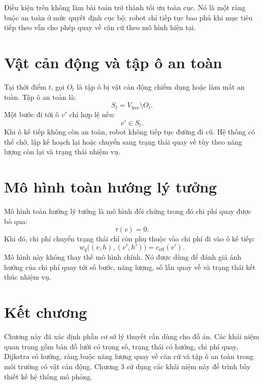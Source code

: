 \documentclass[../DoAn.tex]{subfiles}
\begin{document}
Điều kiện trên không làm bài toán trở thành tối ưu toàn cục. Nó là một ràng buộc an toàn ở mức quyết định cục bộ: robot chỉ tiếp tục bao phủ khi mục tiêu tiếp theo vẫn cho phép quay về căn cứ theo mô hình hiện tại.

\section{Vật cản động và tập ô an toàn}

Tại thời điểm $t$, gọi $O_t$ là tập ô bị vật cản động chiếm dụng hoặc làm mất an toàn. Tập ô an toàn là:
\begin{equation}
S_t=V_{\text{free}}\setminus O_t.
\end{equation}
Một bước đi tới ô $v'$ chỉ hợp lệ nếu:
\begin{equation}
v'\in S_t.
\end{equation}
Khi ô kế tiếp không còn an toàn, robot không tiếp tục đường đi cũ. Hệ thống có thể chờ, lập kế hoạch lại hoặc chuyển sang trạng thái quay về tùy theo năng lượng còn lại và trạng thái nhiệm vụ.

\section{Mô hình toàn hướng lý tưởng}

Mô hình toàn hướng lý tưởng là mô hình đối chứng trong đó chi phí quay được bỏ qua:
\begin{equation}
\tau(v)=0.
\end{equation}
Khi đó, chi phí chuyển trạng thái chỉ còn phụ thuộc vào chi phí đi vào ô kế tiếp:
\begin{equation}
w_q\bigl((v,h),(v',h')\bigr)=c_{\text{eff}}(v').
\end{equation}
Mô hình này không thay thế mô hình chính. Nó được dùng để đánh giá ảnh hưởng của chi phí quay tới số bước, năng lượng, số lần quay về và trạng thái kết thúc nhiệm vụ.

\section{Kết chương}

Chương này đã xác định phần cơ sở lý thuyết cần dùng cho đồ án. Các khái niệm quan trọng gồm bản đồ lưới có trọng số, trạng thái có hướng, chi phí quay, Dijkstra có hướng, ràng buộc năng lượng quay về căn cứ và tập ô an toàn trong môi trường có vật cản động. Chương 3 sử dụng các khái niệm này để trình bày thiết kế hệ thống mô phỏng.
\end{document}

